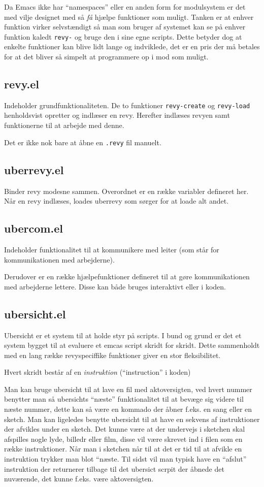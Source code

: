 \documentclass[10pt,a4paper,danish]{article}
\let\oldmarginnote\marginnote
\renewcommand{\marginnote}[1]{\oldmarginnote{\raggedright{}\footnotesize #1}}
\newcommand{\code}[1]{\colorbox{verbgray}{\texttt{#1}}}
\begin{document}
Da Emacs ikke har ``namespaces'' eller en anden form for modulsystem er det med
vilje designet med så \textit{få} hjælpe funktioner som muligt. Tanken er at
enhver funktion virker selvstændigt så man som bruger af systemet kan se på
enhver funktion kaledt \code{revy-} og bruge den i sine egne scripts.
Dette betyder dog at enkelte funktioner kan blive lidt lange og indviklede, det
er en pris der må betales for at det bliver så simpelt at programmere op i mod
som muligt.\marginnote{Implementerings noter?}

\subsection{revy.el}
Indeholder grundfunktionaliteten. De to funktioner \code{revy-create} og
\code{revy-load} henholdsvist opretter og indlæser en revy. Herefter indlæses
revyen samt funktionerne til at arbejde med denne.

Det er ikke nok bare at åbne en \code{.revy} fil manuelt.

\subsection{uberrevy.el}
Binder revy modesne sammen. Overordnet er en række variabler defineret her. Når
en revy indlæses, loades uberrevy som sørger for at loade alt andet.

\subsection{ubercom.el}
Indeholder funktionalitet til at kommunikere med leiter (som står for
kommunikationen med arbejderne).

Derudover er en række hjælpefunktioner defineret til at gøre kommunikationen med
arbejderne lettere. Disse kan både bruges interaktivt eller i koden.

\subsection{ubersicht.el}
Ubersicht er et system til at holde styr på scripts. I bund og grund er det et
system bygget til at evaluere et emcas script skridt for skridt. Dette
sammenholdt med en lang række revyspeciffike funktioner giver en stor
fleksibilitet.

Hvert skridt består af en \textit{instruktion} (``instruction'' i koden)

Man kan bruge ubersicht til at lave en fil med aktoversigten, ved hvert nummer
benytter man så ubersichts ``næste'' funktionalitet til at bevæge sig videre til
næste nummer, dette kan så være en kommado der åbner f.eks. en sang eller en
sketch. Man kan ligeledes benytte ubersicht til at have en sekvens af
instruktioner der afvikles under en sketch. Det kunne være at der undervejs i
sketchen skal afspilles nogle lyde, billedr eller film, disse vil være skrevet
ind i filen som en række instruktioner. Når man i sketchen når til at det er tid
til at afvikle en instruktion trykker man blot ``næste. Til sidst vil man typisk
have en ``afslut'' instruktion der returnerer tilbage til det ubersict scrpit
der åbnede det nuværende, det kunne f.eks. være aktoversigten.
\end{document}

